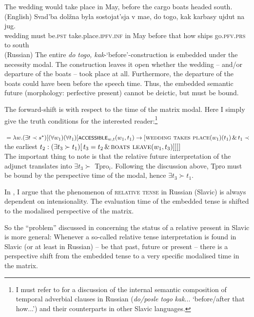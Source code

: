 \documentclass[output=paper,colorlinks,citecolor=brown]{langscibook}
\begin{document}
\ea \ea \label{svad}	
	The wedding would take place in May, before the cargo boats headed south.  
 \hfill (English)
\ex\label{svadru}\gll	Svad'ba dolžna byla sostojat'sja v mae, do togo, kak karbasy ujdut na jug. \\
wedding must be.\textsc{pst} take.place.\textsc{ipfv}.\textsc{inf} in May before that   how ships go.\textsc{pfv}.\textsc{prs} to south \\
\hfill (Russian)
\z\z
The entire \textit{do togo, kak}-`before'-construction is embedded under the necessity modal. The construction leaves it open whether the wedding -- and/or departure of the boats -- took place at all. Furthermore, the departure of the boats could have been before the speech time. Thus, the embedded semantic future (morphology: perfective present) cannot be deictic, but must be bound.

The  forward-shift is with respect to the time of the matrix modal. Here I simply give the truth conditions for the interested reader:\footnote{I must refer  to \citet{gronn_stechow2012} for a discussion of the internal semantic composition of temporal adverbial clauses in Russian (\textit{do/posle} \textit{togo} \textit{kak}... `before/after that how...') and their counterparts in other Slavic languages.}

\ea
{}${}= \lambda w.(\exists t  \prec s^{*})[(\forall w_{1})(\forall t_{1})[\cnst{accessible}_{w,t}(w_{1}, t_{1}) \rightarrow  [\textsc{wedding takes place}(w_{1})(t_{1}) \,
\& \, t_{1} \prec$ the earliest $t_{2}: (\exists t_{3} \succ t_{1})[ \, t_{3} = t_{2} \, \&  \, \textsc{boats leave}(w_{1},t_{3})]]]]$\\\hfill \citep{gronn_stechow2012}
\z
The important thing to note is that the relative future interpretation of the adjunct translates into $\exists t_{3} \succ$ Tpro$_{i}$. Following the discussion above, Tpro must be bound by the perspective time of the modal, hence $\exists t_{3} \succ t_{1}$.

In \citet{gronn24}, I argue that
the phenomenon of \textsc{relative tense} in Russian (Slavic) is always dependent on intensionality. The evaluation time of the embedded tense is shifted to the modalised perspective of the matrix.

So the ``problem'' discussed in  concerning the status of a relative present in Slavic is 
 more general: Whenever a so-called relative tense interpretation is found in Slavic (or at least in Russian) -- be that past, future or present -- there is a perspective shift from the embedded tense to a very specific modalised time in the matrix.
\end{document}
